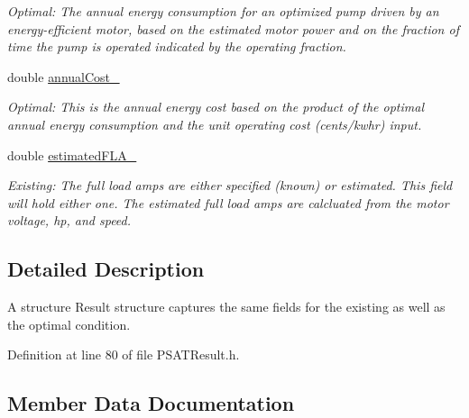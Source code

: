 \begin{DoxyCompactItemize}
\begin{DoxyCompactList}\small\item\em Optimal\+: The annual energy consumption for an optimized pump driven by an energy-\/efficient motor, based on the estimated motor power and on the fraction of time the pump is operated indicated by the operating fraction. \end{DoxyCompactList}\item 
double \hyperlink{struct_p_s_a_t_result_1_1result___abccf2d1c8dabf109df4c3c369cb24365}{annual\+Cost\+\_\+}
\begin{DoxyCompactList}\small\item\em Optimal\+: This is the annual energy cost based on the product of the optimal annual energy consumption and the unit operating cost (cents/kwhr) input. \end{DoxyCompactList}\item 
\mbox{\label{struct_p_s_a_t_result_1_1result___a35d120feb27c2ee3f0dd3f995b4d7840}} 
double \hyperlink{struct_p_s_a_t_result_1_1result___a35d120feb27c2ee3f0dd3f995b4d7840}{estimated\+F\+L\+A\+\_\+}
\begin{DoxyCompactList}\small\item\em Existing\+: The full load amps are either specified (known) or estimated. This field will hold either one. The estimated full load amps are calcluated from the motor voltage, hp, and speed. \end{DoxyCompactList}\end{DoxyCompactItemize}


\subsection{Detailed Description}
A structure Result structure captures the same fields for the existing as well as the optimal condition. 

Definition at line 80 of file P\+S\+A\+T\+Result.\+h.



\subsection{Member Data Documentation}
\mbox{\label{struct_p_s_a_t_result_1_1result___abccf2d1c8dabf109df4c3c369cb24365}} 

